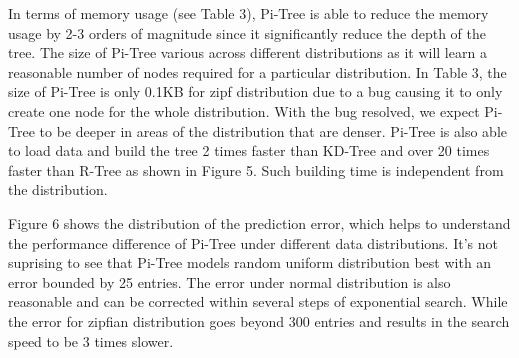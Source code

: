 \documentclass[sigconf,10pt]{acmart}
\begin{document}
In terms of memory usage (see Table 3), Pi-Tree is able to reduce the memory usage by 2-3 orders of magnitude
since it significantly reduce the depth of the tree. The size of Pi-Tree various across different distributions
as it will learn a reasonable number
of nodes required for a particular distribution. In Table 3, the size of Pi-Tree is only 0.1KB for zipf
distribution due to a bug causing it to only create one node for the whole distribution. 
With the bug resolved, we expect Pi-Tree to be deeper in areas of the distribution that are denser.
Pi-Tree is also able to load data and build the tree 2 times faster than KD-Tree and over 20 times
faster than R-Tree as shown in Figure 5. Such building time is independent from the distribution.

Figure 6 shows the distribution of the prediction error, which helps to understand the performance
difference of Pi-Tree under different data distributions. It's not suprising to see that Pi-Tree
models random uniform distribution best with an error bounded by 25 entries. The error under
normal distribution is also reasonable and can be corrected within several steps of exponential search.
While the error for zipfian distribution goes beyond 300 entries and results in the
search speed to be 3 times slower.
\end{document}
